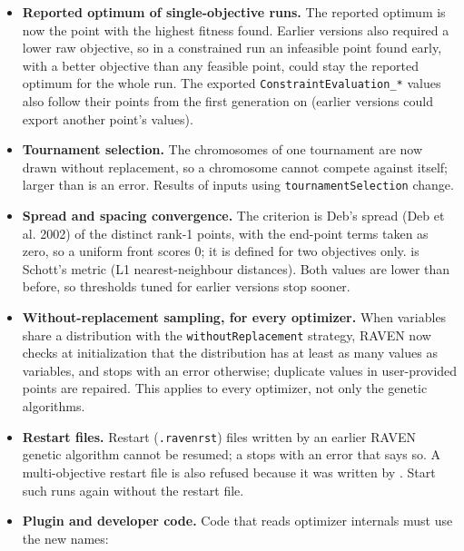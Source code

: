 \begin{itemize}
    improves for \texttt{min} objectives (earlier versions favored the larger objective even for
    \texttt{min}), and a constraint violation always lowers it. Inputs using these options give
    different results.
  \item \textbf{Reported optimum of single-objective runs.} The reported optimum is now the point with the
    highest fitness found. Earlier versions also required a lower raw objective, so in a constrained run an
    infeasible point found early, with a better objective than any feasible point, could stay the reported
    optimum for the whole run. The exported \texttt{ConstraintEvaluation\_*} values also follow their points
    from the first generation on (earlier versions could export another point's values).
  \item \textbf{Tournament selection.} The  chromosomes of one tournament are now
    drawn without replacement, so a chromosome cannot compete against itself;  larger
    than  is an error. Results of inputs using \texttt{tournamentSelection} change.
  \item \textbf{Spread and spacing convergence.} The  criterion is Deb's spread
    (Deb et al. 2002) of the distinct rank-1 points, with the end-point terms taken as zero, so a uniform
    front scores 0; it is defined for two objectives only.  is Schott's metric (L1
    nearest-neighbour distances). Both values are lower than before, so thresholds tuned for earlier
    versions stop sooner.
  \item \textbf{Without-replacement sampling, for every optimizer.} When variables share a
     distribution with the \texttt{withoutReplacement} strategy, RAVEN now checks
    at initialization that the distribution has at least as many values as variables, and stops with an
    error otherwise; duplicate values in user-provided  points are repaired. This applies
    to every optimizer, not only the genetic algorithms.
  \item \textbf{Restart files.} Restart (\texttt{.ravenrst}) files written by an earlier RAVEN genetic
    algorithm cannot be resumed; a  stops with an error that says so. A
    multi-objective restart file is also refused because it was written by .
    Start such runs again without the restart file.
  \item \textbf{Plugin and developer code.} Code that reads optimizer internals must use the new names:

\end{itemize}
